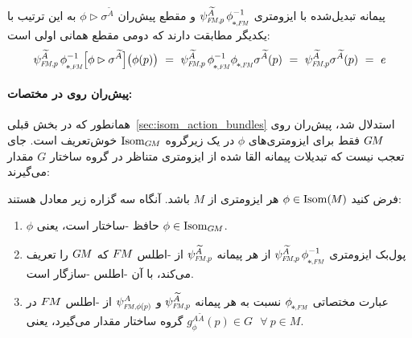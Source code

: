 پیمانه تبدیل‌شده با ایزومتری $\psiFMp^{\widetilde{A}}\, \dphiFM^{-1}$ و مقطع پیش‌ران $\phi \rhd \sigma^{\widetilde{A}}$ به این ترتیب با یکدیگر مطابقت دارند که دومی مقطع همانی اولی است:
\begin{align}
    \psiFMp^{\widetilde{A}}\, \dphiFM^{-1} \pig[ \phi \rhd \sigma^{\widetilde{A}} \pig] \big(\phi(p)\big)
    \ =\ \psiFMp^{\widetilde{A}}\, \dphiFM^{-1} \dphiFM \sigma^{\widetilde{A}}(p)
    \ =\ \psiFMp^{\widetilde{A}} \sigma^{\widetilde{A}}(p)
    \ =\ e
\end{align}






\paragraph{پیش‌ران روی  در مختصات:}
همانطور که در بخش قبلی~\ref{sec:isom_action_bundles} استدلال شد، پیش‌ران روی $G\mkern-1.4muM$ فقط برای ایزومتری‌های $\phi$ در یک زیرگروه $\operatorname{Isom}_{G\mkern-1.4muM}$ خوش‌تعریف است.
جای تعجب نیست که تبدیلات پیمانه القا شده از ایزومتری متناظر در گروه ساختار $G$ مقدار می‌گیرند:
\begin{thm}
\label{thm:isom_GM_in_coords}
    فرض کنید $\phi \in \operatorname{Isom}(\mkern-1.5mu M \mkern-.5mu)$ هر ایزومتری از $M$ باشد.
    آنگاه سه گزاره زیر معادل هستند:
    \begin{enumerate}
        \item $\phi$ حافظ -ساختار است، یعنی $\phi \in \operatorname{Isom}_{G\mkern-1.4muM}$.
        \item پول‌بک ایزومتری $\psiFMp^{\widetilde{A}}\, \dphiFM^{-1}$ از هر پیمانه $\psiFMp^{\widetilde{A}}$ از -اطلس $F\mkern-1.5muM$ که $G\mkern-1.4muM$ را تعریف می‌کند، با آن -اطلس -سازگار است.
        \item
        عبارت مختصاتی $\dphiFM$ نسبت به هر پیمانه $\psiFMp^{\widetilde{A}}$ و $\psiFMphip^A$ از -اطلس $F\mkern-1.5muM$ در گروه ساختار مقدار می‌گیرد، یعنی $g_\phi^{A\widetilde{A}}(p) \in G\ \ \ \forall\ p \in M$.
    \end{enumerate}
\end{thm}
